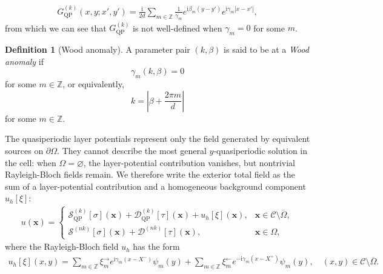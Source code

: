 \documentclass[11pt,fleqn]{article}
\newcommand{\ii}{\mathrm{i}}
\theoremstyle{definition}
\newtheorem{definition}{Definition}
\theoremstyle{remark}
\begin{document}
\begin{align}
  G_\mathrm{QP}^{(k)}(x,y;x',y') = \frac{\ii}{2d} \sum_{m\in\mathbb{Z}} \frac{1}{\gamma_m} e^{\ii \beta_m (y - y')} e^{\ii \gamma_m |x - x'|}, \label{eq:qp-green-spectral}
\end{align}
from which we can see that $G_\mathrm{QP}^{(k)}$ is not well-defined when $\gamma_m = 0$
for some $m$.
\begin{definition}[Wood anomaly]
A parameter pair $(k,\beta)$ is said to be at a \emph{Wood anomaly}
if
\[
  \gamma_m(k,\beta)=0
\]
for some $m\in\mathbb Z$, or equivalently,
\[
  k=\left|\beta+\frac{2\pi m}{d}\right|
\]
for some $m\in\mathbb Z$.
\end{definition}

The quasiperiodic layer potentials represent only the field generated
by equivalent sources on $\partial\Omega$. They cannot describe the
most general $y$-quasiperiodic solution in the cell: when
$\Omega=\varnothing$, the layer-potential contribution vanishes, but
nontrivial Rayleigh-Bloch fields remain. We therefore write the
exterior total field as the sum of a layer-potential contribution and
a homogeneous background component $u_h[\xi]$:
\begin{align}
  u(\mathbf{x}) = \begin{cases}
    \mathcal{S}^{(k)}_{\mathrm{QP}}[\sigma](\mathbf{x}) + \mathcal{D}^{(k)}_{\mathrm{QP}}[\tau](\mathbf{x}) + u_h[\xi](\mathbf{x}), & \mathbf{x} \in \mathcal{C}\setminus \overline{\Omega},\\
    \mathcal{S}^{(nk)}[\sigma](\mathbf{x}) + \mathcal{D}^{(nk)}[\tau](\mathbf{x}), & \mathbf{x} \in \Omega,
  \end{cases}
\end{align}
where the Rayleigh-Bloch field $u_h$ has the form 
\begin{align}
  u_h[\xi](x, y) = \sum_{m \in \mathbb{Z}} \xi_m^\rightarrow e^{\ii \gamma_m (x - X^-)} \psi_m(y) + \sum_{m \in \mathbb{Z}} \xi_m^\leftarrow e^{-\ii \gamma_m (x - X^+)} \psi_m(y),\quad (x, y) \in \mathcal{C}\setminus \overline{\Omega}.  \label{eq:homogeneous-field}
\end{align}
\end{document}
